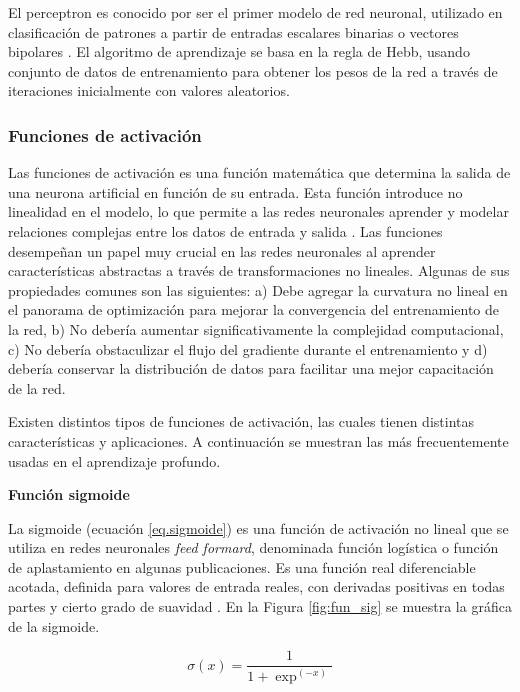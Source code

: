El perceptron es conocido por ser el primer modelo de red neuronal, utilizado en clasificación de patrones a partir de entradas escalares binarias o vectores bipolares \citep{rosenblatt1958perceptron}. El algoritmo de aprendizaje se basa en la regla de Hebb, usando conjunto de datos de entrenamiento  para obtener los pesos de la red a través de iteraciones inicialmente con valores aleatorios.

\subsubsection{Funciones de activación}

Las funciones de activación es una función matemática que determina la salida de una neurona artificial en función de su entrada. Esta función introduce no linealidad en el modelo, lo que permite a las redes neuronales aprender y modelar relaciones complejas entre los datos de entrada y salida \citep{dubey2022activation}. Las funciones desempeñan un papel muy crucial en las redes neuronales al aprender características abstractas a través de transformaciones no lineales. Algunas de sus propiedades comunes son las siguientes: a) Debe agregar la curvatura no lineal en el panorama de optimización para mejorar la convergencia del entrenamiento de la red, b) No debería aumentar significativamente la complejidad computacional, c) No debería obstaculizar el flujo del gradiente durante el entrenamiento y d) debería conservar la distribución de datos para facilitar una mejor capacitación de la red.

Existen distintos tipos de funciones de activación, las cuales tienen distintas características y aplicaciones. A continuación se muestran las más frecuentemente usadas en el aprendizaje profundo. 

\textbf{Función sigmoide}

La sigmoide (ecuación \ref{eq.sigmoide}) es una función de activación no lineal que se utiliza en redes neuronales \textit{feed formard}, denominada función logística o función de aplastamiento en algunas publicaciones. Es una función real diferenciable acotada, definida para valores de entrada reales, con derivadas positivas en todas partes y cierto grado de suavidad \citep{han1995influence}. En la Figura \ref{fig:fun_sig} se muestra la gráfica de la sigmoide.

\begin{equation}
    \sigma(x) = \frac{1}{1 + \exp^{(-x)}}
    \label{eq.sigmoide}
\end{equation}

